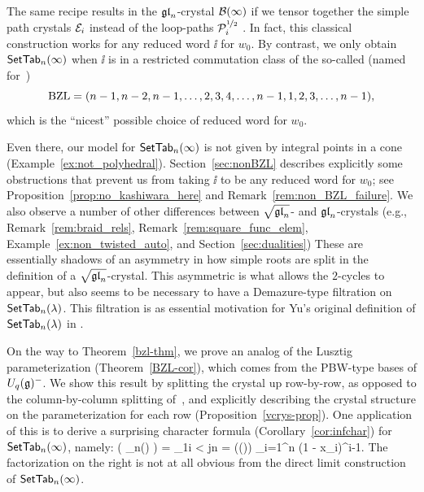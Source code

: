 \documentclass[11pt]{article}
\begin{document}
The same recipe results in the $\mathfrak{gl}_n$-crystal $\mathcal{B}(\infty)$ if we tensor together the simple path crystals  $\mathcal E_i$ instead of the loop-paths $\mathcal{P}^{\nicefrac{1}{2}}_i$ \cite[\S12]{BumpSchilling}.
In fact, this classical construction works for any reduced word $\ii$ for $w_0$.
By contrast, we only obtain $\mathsf{SetTab}_n(\infty)$ when $\ii$ is in a restricted commutation class of the so-called  %
(named for~\cite{BZ01,Littelmann98})
\[
\mathrm{BZL} = (n-1, n-2, n-1,  \dotsc, 2,3,4,\dots,n-1,  1,2,3, \dotsc, n-1),
\] which is the ``nicest'' possible choice of reduced word for $w_0$. 

Even there,  our model for $\mathsf{SetTab}_n(\infty)$ is not given by integral points in a cone (Example~\ref{ex:not_polyhedral}).
Section~\ref{sec:nonBZL} describes explicitly some obstructions that prevent us from taking $\ii$ to be any reduced word for $w_0$; see  Proposition~\ref{prop:no_kashiwara_here} and Remark~\ref{rem:non_BZL_failure}.
We also observe a number of other differences between $\sqrt{\mathfrak{gl}_n}$- and $\mathfrak{gl}_n$-crystals (e.g.,  Remark~\ref{rem:braid_rels}, Remark~\ref{rem:square_func_elem}, Example~\ref{ex:non_twisted_auto}, and Section~\ref{sec:dualities})
These are essentially shadows of an asymmetry in how simple roots are split in the definition
of a $\sqrt{\mathfrak{gl}_n}$-crystal. This asymmetric is what allows the $2$-cycles to appear, but also seems to be necessary to have a Demazure-type filtration on $\mathsf{SetTab}_n(\lambda)$. This filtration is as essential motivation for Yu's original definition 
of $\mathsf{SetTab}_n(\lambda)$ in \cite{Yu23}.


On the way to Theorem~\ref{bzl-thm}, we prove an analog of the Lusztig parameterization (Theorem~\ref{BZL-cor}), which comes from the PBW-type bases of $U_q(\mathfrak{g})^-$.
We show this result by splitting the crystal up row-by-row, as opposed to the column-by-column splitting of~\cite{Yu23}, %
and explicitly describing the crystal structure on the parameterization for each row (Proposition~\ref{vcrys-prop}).
One application of this  is to derive a surprising character formula (Corollary~\ref{cor:infchar}) for 
$\mathsf{SetTab}_n(\infty)$, namely:
\be
\ch\bigl( \SetTab_n(\infty) \bigr) = \prod_{1\leq i < j\leq n} 
= \ch\bigl(\cB(\infty)\bigr)  \prod_{i=1}^n (1 - \beta x_i)^{i-1}.
\ee
The factorization on the right is not at all obvious from the direct limit construction of $\mathsf{SetTab}_n(\infty)$.
\end{document}
